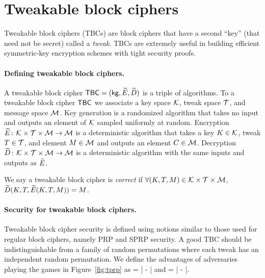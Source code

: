 



\section{Tweakable block ciphers}
\label{sec:tbcs}

Tweakable block ciphers (TBCs) are block ciphers that have a second ``key'' (that need not be secret) called a \emph{tweak}. TBCs are extremely useful in building efficient symmetric-key encryption schemes with tight security proofs.




\paragraph{Defining tweakable block ciphers.} A tweakable block cipher $\mathsf{TBC} = ({\sf kg}, \widetilde{E}, \widetilde{D})$ is a triple of 
algorithms. To a tweakable block cipher $\mathsf{TBC}$ we associate a key space ${\cal K}$, tweak space $\mathcal{T}$, and message space ${\cal M}$. Key generation is a randomized algorithm that takes no input and outputs an element of ${\cal K}$ sampled uniformly at random. Encryption $\widetilde{E}{{\kern .05em}\colon{\kern .05em}}{\cal K}\times\mathcal{T}\times{\cal M}\rightarrow{\cal M}$ is a deterministic algorithm that takes a key $K\in{\cal K}$, tweak $T\in\mathcal{T}$, and element $M\in{\cal M}$ and outputs an element $C\in{\cal M}$. Decryption $\widetilde{D}{{\kern .05em}\colon{\kern .05em}}{\cal K}\times\mathcal{T}\times{\cal M}\rightarrow{\cal M}$ is a deterministic algorithm with the same inputs and outputs as $\widetilde{E}$.

We say a tweakable block cipher is \emph{correct} if $\forall (K, T, M)\in{\cal K}\times\mathcal{T}\times{\cal M}$, $\widetilde{D}(K, T, \widetilde{E}(K, T, M))=M$.

\paragraph{Security for tweakable block ciphers.}

Tweakable block cipher security is defined using notions similar to those used for regular block ciphers, namely PRP and SPRP security. A good TBC should be indistinguishable from a family of random permutations where each tweak has an independent random permutation. We define the advantages of adversaries playing the games in Figure~\ref{fig:tprp} as 
\bnm
\AdvSTPRP{\tweakCipher}{\advA} = \left| -
 \right|
\enm
and
\bnm
\AdvTSPRP{\tweakCipher}{\advA} = \left| -
 \right|\;.
\enm


